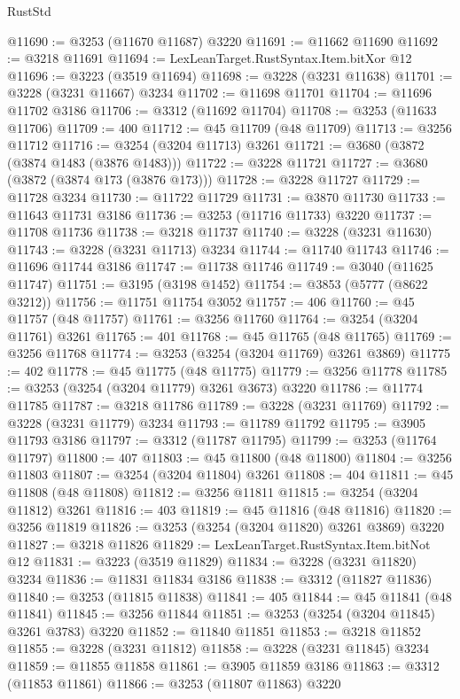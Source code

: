 \begin{lexlean}{RustStd}
\begin{coremodule}
@11690 := @3253 (@11670 @11687) @3220
@11691 := @11662 @11690
@11692 := @3218 @11691
@11694 := LexLeanTarget.RustSyntax.Item.bitXor @12
@11696 := @3223 (@3519 @11694)
@11698 := @3228 (@3231 @11638)
@11701 := @3228 (@3231 @11667) @3234
@11702 := @11698 @11701
@11704 := @11696 @11702 @3186
@11706 := @3312 (@11692 @11704)
@11708 := @3253 (@11633 @11706)
@11709 := 400
@11712 := @45 @11709 (@48 @11709)
@11713 := @3256 @11712
@11716 := @3254 (@3204 @11713) @3261
@11721 := @3680 (@3872 (@3874 @1483 (@3876 @1483)))
@11722 := @3228 @11721
@11727 := @3680 (@3872 (@3874 @173 (@3876 @173)))
@11728 := @3228 @11727
@11729 := @11728 @3234
@11730 := @11722 @11729
@11731 := @3870 @11730
@11733 := @11643 @11731 @3186
@11736 := @3253 (@11716 @11733) @3220
@11737 := @11708 @11736
@11738 := @3218 @11737
@11740 := @3228 (@3231 @11630)
@11743 := @3228 (@3231 @11713) @3234
@11744 := @11740 @11743
@11746 := @11696 @11744 @3186
@11747 := @11738 @11746
@11749 := @3040 (@11625 @11747)
@11751 := @3195 (@3198 @1452)
@11754 := @3853 (@5777 (@8622 @3212))
@11756 := @11751 @11754 @3052
@11757 := 406
@11760 := @45 @11757 (@48 @11757)
@11761 := @3256 @11760
@11764 := @3254 (@3204 @11761) @3261
@11765 := 401
@11768 := @45 @11765 (@48 @11765)
@11769 := @3256 @11768
@11774 := @3253 (@3254 (@3204 @11769) @3261 @3869)
@11775 := 402
@11778 := @45 @11775 (@48 @11775)
@11779 := @3256 @11778
@11785 := @3253 (@3254 (@3204 @11779) @3261 @3673) @3220
@11786 := @11774 @11785
@11787 := @3218 @11786
@11789 := @3228 (@3231 @11769)
@11792 := @3228 (@3231 @11779) @3234
@11793 := @11789 @11792
@11795 := @3905 @11793 @3186
@11797 := @3312 (@11787 @11795)
@11799 := @3253 (@11764 @11797)
@11800 := 407
@11803 := @45 @11800 (@48 @11800)
@11804 := @3256 @11803
@11807 := @3254 (@3204 @11804) @3261
@11808 := 404
@11811 := @45 @11808 (@48 @11808)
@11812 := @3256 @11811
@11815 := @3254 (@3204 @11812) @3261
@11816 := 403
@11819 := @45 @11816 (@48 @11816)
@11820 := @3256 @11819
@11826 := @3253 (@3254 (@3204 @11820) @3261 @3869) @3220
@11827 := @3218 @11826
@11829 := LexLeanTarget.RustSyntax.Item.bitNot @12
@11831 := @3223 (@3519 @11829)
@11834 := @3228 (@3231 @11820) @3234
@11836 := @11831 @11834 @3186
@11838 := @3312 (@11827 @11836)
@11840 := @3253 (@11815 @11838)
@11841 := 405
@11844 := @45 @11841 (@48 @11841)
@11845 := @3256 @11844
@11851 := @3253 (@3254 (@3204 @11845) @3261 @3783) @3220
@11852 := @11840 @11851
@11853 := @3218 @11852
@11855 := @3228 (@3231 @11812)
@11858 := @3228 (@3231 @11845) @3234
@11859 := @11855 @11858
@11861 := @3905 @11859 @3186
@11863 := @3312 (@11853 @11861)
@11866 := @3253 (@11807 @11863) @3220

\end{coremodule}
\end{lexlean}
